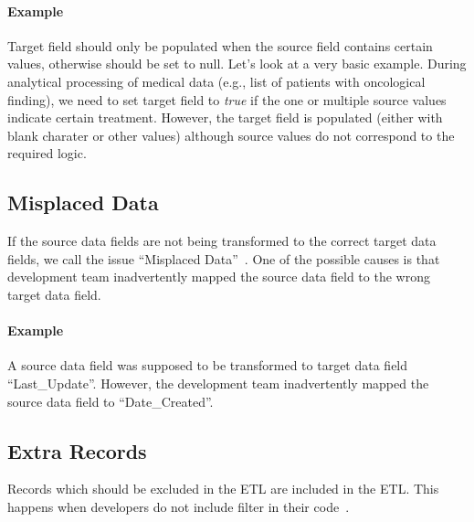 \paragraph*{Example} Target field should only be populated when the source field contains certain values, otherwise should be set to null.
Let's look at a very basic example.
During analytical processing of medical data (e.g., list of patients with oncological finding), we need to set target field to \textit{true} if the one or multiple source values indicate certain treatment.
However, the target field is populated (either with blank charater or other values) although source values do not correspond to the required logic.


\subsection*{Misplaced Data}

If the source data fields are not being transformed to the correct target data fields, we call the issue \enquote{Misplaced Data}~\cite{web:common-defects}.
One of the possible causes is that development team inadvertently mapped the source data field to the wrong target data field.

\paragraph*{Example} A source data field was supposed to be transformed to target data field \enquote{Last\_Update}.
However, the development team inadvertently mapped the source data field to \enquote{Date\_Created}.


\subsection*{Extra Records}

Records which should be excluded in the ETL are included in the ETL.
This happens when developers do not include filter in their code~\cite{web:common-defects}.

